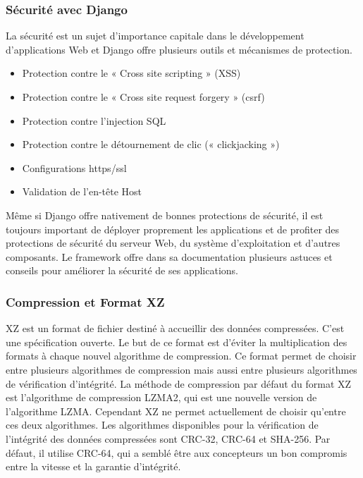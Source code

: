 	  \subsubsection{S\'ecurit\'e avec Django}
	  La sécurité est un sujet d’importance capitale dans le développement d’applications Web et Django offre plusieurs outils et mécanismes de protection. 
	  \begin{itemize}
	    \item Protection contre le « Cross site scripting » (XSS)
	    \item Protection contre le « Cross site request forgery » (\gls{csrf})
	    \item Protection contre l’injection SQL
	    \item Protection contre le détournement de clic (« clickjacking »)
	    \item Configurations \gls{https}/\gls{ssl}
	    \item Validation de l’en-tête Host
	  \end{itemize}
	  Même si Django offre nativement de bonnes protections de sécurité, il est toujours important de déployer proprement les applications et de profiter des protections de sécurité du serveur Web, du système d’exploitation et d’autres composants. Le framework offre dans sa documentation plusieurs astuces et conseils pour am\'eliorer la s\'ecurit\'e de ses applications.

	  
  \subsubsection{Compression et Format XZ}
	XZ est un format de fichier destiné à accueillir des données compressées. C'est une spécification ouverte. Le but de ce format est d'éviter la multiplication des formats à chaque nouvel algorithme de compression. Ce format permet de choisir entre plusieurs algorithmes de compression mais aussi entre plusieurs algorithmes de vérification d'intégrité. La méthode de compression par défaut du format XZ est l'algorithme de compression LZMA2, qui est une nouvelle version de l'algorithme LZMA. Cependant XZ ne permet actuellement de choisir qu'entre ces deux algorithmes. Les algorithmes disponibles pour la vérification de l'intégrité des données compressées sont CRC-32, CRC-64 et SHA-256. Par défaut, il utilise CRC-64, qui a semblé être aux concepteurs un bon compromis entre la vitesse et la garantie d'intégrité.


